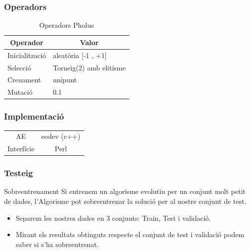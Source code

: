 \documentclass{beamer}
\begin{document}

\begin{frame}
\frametitle{Operadors}


\begin{table}
\centering
\begin{tabular}{|l|l|}
\hline
\multicolumn{1}{|c|}{\textbf{Operador }} & \multicolumn{1}{c|}{\textbf{ Valor}} \\
\hline
\hline
Inicialització & aleatòria [-1 , +1] \\
Selecció       & Torneig(2) amb elitisme  \\
Creuament       &  unipunt        \\
Mutació        &   0.1                  \\
\hline
\end{tabular}
\caption{Operadors Pholus}
\end{table}

\end{frame}

\begin{frame}
\frametitle{Implementació}
\begin{center}
	
	\begin{tabular}[h!]{|c|c|}
		AE & eodev (c++)                \\ 
		Interfície & Perl    \\ 
	\end{tabular}
\end{center}
\end{frame}

\begin{frame}
	\frametitle{Testeig}
	\begin{block}{Sobreentrenament}
		Si entrenem un algorisme evolutiu per un conjunt molt petit de dades, l'Algorisme pot
		sobreentrenar la solució per al nostre conjunt de test.
	\end{block}
	\begin{itemize}
		\item Separem les nostres dades en 3 conjunts: Train, Test i validació.
		\item Mirant els resultats obtinguts respecte el conjunt de test i validació podem saber si
			s'ha sobreentrenat.
	\end{itemize}
\end{frame}
\end{document}

